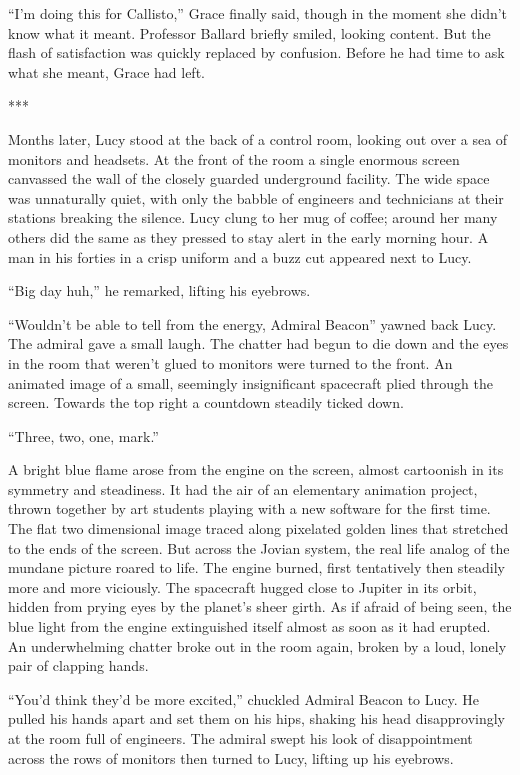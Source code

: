 \documentclass[12pt]{article} %
\begin{document}
``I'm doing this for Callisto,'' Grace finally said, though in the moment she didn't know what it meant. Professor Ballard briefly smiled, looking content. But the flash of satisfaction was quickly replaced by confusion. Before he had time to ask what she meant, Grace had left.

\begin{center}
***
\end{center}

Months later, Lucy stood at the back of a control room, looking out over a sea of monitors and headsets. At the front of the room a single enormous screen canvassed the wall of the closely guarded underground facility. The wide space was unnaturally quiet, with only the babble of engineers and technicians at their stations breaking the silence. Lucy clung to her mug of coffee; around her many others did the same as they pressed to stay alert in the early morning hour. A man in his forties in a crisp uniform and a buzz cut appeared next to Lucy.

``Big day huh,'' he remarked, lifting his eyebrows.

``Wouldn't be able to tell from the energy, Admiral Beacon'' yawned back Lucy. The admiral gave a small laugh. The chatter had begun to die down and the eyes in the room that weren't glued to monitors were turned to the front. An animated image of a small, seemingly insignificant spacecraft plied through the screen. Towards the top right a countdown steadily ticked down.

``Three, two, one, mark.''

A bright blue flame arose from the engine on the screen, almost cartoonish in its symmetry and steadiness. It had the air of an elementary animation project, thrown together by art students playing with a new software for the first time. The flat two dimensional image traced along pixelated golden lines that stretched to the ends of the screen. But across the Jovian system, the real life analog of the mundane picture roared to life. The engine burned, first tentatively then steadily more and more viciously. The spacecraft hugged close to Jupiter in its orbit, hidden from prying eyes by the planet's sheer girth. As if afraid of being seen, the blue light from the engine extinguished itself almost as soon as it had erupted. An underwhelming chatter broke out in the room again, broken by a loud, lonely pair of clapping hands.

``You'd think they'd be more excited,'' chuckled Admiral Beacon to Lucy. He pulled his hands apart and set them on his hips, shaking his head disapprovingly at the room full of engineers. The admiral swept his look of disappointment across the rows of monitors then turned to Lucy, lifting up his eyebrows. 
\end{document}
